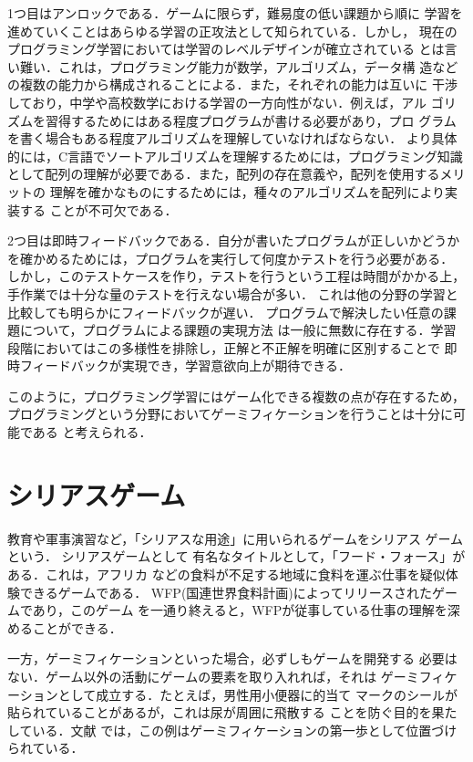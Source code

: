 \documentclass{jreport}
\begin{document}
1つ目はアンロックである．ゲームに限らず，難易度の低い課題から順に
学習を進めていくことはあらゆる学習の正攻法として知られている．しかし，
現在のプログラミング学習においては学習のレベルデザインが確立されている
とは言い難い．これは，プログラミング能力が数学，アルゴリズム，データ構
造などの複数の能力から構成されることによる．また，それぞれの能力は互いに
干渉しており，中学や高校数学における学習の一方向性がない．例えば，アル
ゴリズムを習得するためにはある程度プログラムが書ける必要があり，プロ
グラムを書く場合もある程度アルゴリズムを理解していなければならない．
より具体的には，C言語でソートアルゴリズムを理解するためには，プログラミング知識
として配列の理解が必要である．また，配列の存在意義や，配列を使用するメリットの
理解を確かなものにするためには，種々のアルゴリズムを配列により実装する
ことが不可欠である．

2つ目は即時フィードバックである．自分が書いたプログラムが正しいかどうか
を確かめるためには，プログラムを実行して何度かテストを行う必要がある．
しかし，このテストケースを作り，テストを行うという工程は時間がかかる上，
手作業では十分な量のテストを行えない場合が多い．
これは他の分野の学習と比較しても明らかにフィードバックが遅い．
プログラムで解決したい任意の課題について，プログラムによる課題の実現方法
は一般に無数に存在する．学習段階においてはこの多様性を排除し，正解と不正解を明確に区別することで
即時フィードバックが実現でき，学習意欲向上が期待できる．

このように，プログラミング学習にはゲーム化できる複数の点が存在するため，
プログラミングという分野においてゲーミフィケーションを行うことは十分に可能である
と考えられる．

\section{シリアスゲーム}
教育や軍事演習など，「シリアスな用途」に用いられるゲームをシリアス
ゲームという\cite{Inoue:Gamification}．
シリアスゲームとして
有名なタイトルとして，「フード・フォース」がある．これは，アフリカ
などの食料が不足する地域に食料を運ぶ仕事を疑似体験できるゲームである．
WFP(国連世界食料計画)によってリリースされたゲームであり，このゲーム
を一通り終えると，WFPが従事している仕事の理解を深めることができる．

一方，ゲーミフィケーションといった場合，必ずしもゲームを開発する
必要はない．ゲーム以外の活動にゲームの要素を取り入れれば，それは
ゲーミフィケーションとして成立する．たとえば，男性用小便器に的当て
マークのシールが貼られていることがあるが，これは尿が周囲に飛散する
ことを防ぐ目的を果たしている．文献\cite{Inoue:Gamification}
では，この例はゲーミフィケーションの第一歩として位置づけられている．
\end{document}
